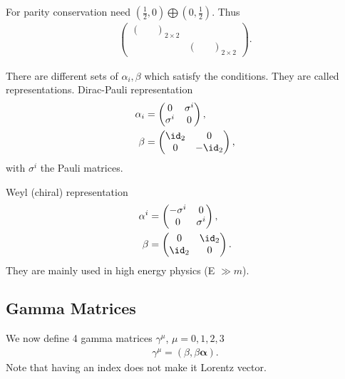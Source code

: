 For parity conservation need $(\frac{1}{2}, 0) \bigoplus (0, \frac{1}{2})$.
Thus 
\begin{align*}
   \begin{pmatrix} \begin{pmatrix} & \\ & \end{pmatrix}_{2\times2} & \\ & \begin{pmatrix} & \\ &  \end{pmatrix}_{2\times2}   \end{pmatrix}.
\end{align*}

There are different sets of $\alpha_i, \beta$ which satisfy the conditions. They are called representations.
Dirac-Pauli representation
\begin{align}
   \alpha_i &= \begin{pmatrix} 0 & \sigma^i \\ \sigma^i &  0 \end{pmatrix}, \\
   \beta &= \begin{pmatrix} \id_2 & 0 \\ 0 & -\id_2\end{pmatrix},
\end{align}
with $\sigma^i$ the Pauli matrices.

Weyl (chiral) representation
\begin{align}
   \alpha^i &= \begin{pmatrix} -\sigma^i & 0 \\ 0 & \sigma^i \end{pmatrix},  \\
   \beta &= \begin{pmatrix} 0 & \id_2 \\ \id_2 & 0 \end{pmatrix}.
\end{align}
They are mainly used in high energy physics (E $\gg m$).

\subsection{Gamma Matrices}
We now define 4 gamma matrices $\gamma^\mu$, $\mu=0,1,2,3$
\begin{align}
   \gamma^\mu = \left(\beta, \beta \pmb{\alpha} \right).
\end{align}
Note that having an index does not make it Lorentz vector.


